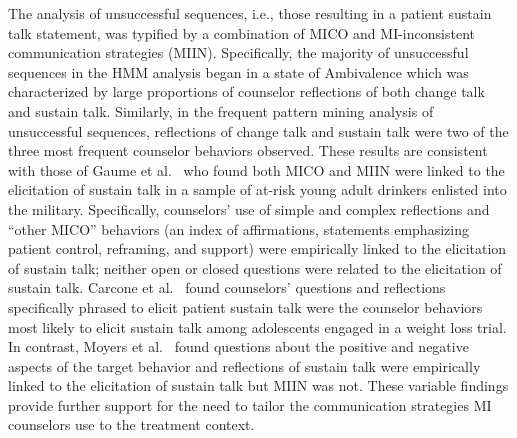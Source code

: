 The analysis of unsuccessful sequences, i.e., those resulting in a patient sustain talk statement, was typified by a combination of MICO and MI-inconsistent communication strategies (MIIN). Specifically, the majority of unsuccessful sequences in the HMM analysis began in a state of Ambivalence which was characterized by large proportions of counselor reflections of both change talk and sustain talk. Similarly, in the frequent pattern mining analysis of unsuccessful sequences, reflections of change talk and sustain talk were two of the three most frequent counselor behaviors observed. These results are consistent with those of Gaume et al.~\cite{gaume2010counselor} who found both MICO and MIIN were linked to the elicitation of sustain talk in a sample of at-risk young adult drinkers enlisted into the military. Specifically, counselors’ use of simple and complex reflections and ``other MICO'' behaviors (an index of affirmations, statements emphasizing patient control, reframing, and support) were empirically linked to the elicitation of sustain talk; neither open or closed questions were related to the elicitation of sustain talk. Carcone et al.~\cite{carcone2013provider} found counselors’ questions and reflections specifically phrased to elicit patient sustain talk were the counselor behaviors most likely to elicit sustain talk among adolescents engaged in a weight loss trial. In contrast, Moyers et al.~\cite{moyers2009session} found questions about the positive and negative aspects of the target behavior and reflections of sustain talk were empirically linked to the elicitation of sustain talk but MIIN was not. These variable findings provide further support for the need to tailor the communication strategies MI counselors use to the treatment context. 

